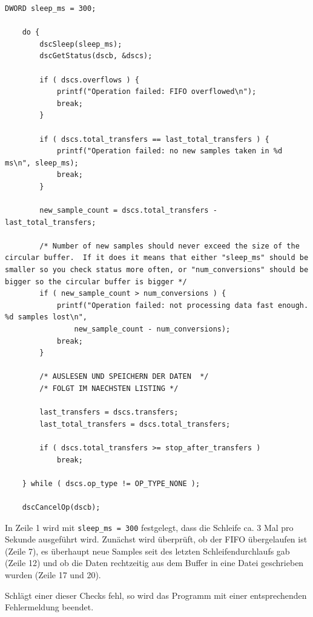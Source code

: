\documentclass[12pt,a4paper,twoside,BCOR=12.5mm]{scrartcl}
\begin{document}
\begin{lstlisting}[frame=trBL]
	DWORD sleep_ms = 300;
	
	do {
        dscSleep(sleep_ms);
        dscGetStatus(dscb, &dscs);

        if ( dscs.overflows ) {
            printf("Operation failed: FIFO overflowed\n");
            break;
        }

        if ( dscs.total_transfers == last_total_transfers ) {
            printf("Operation failed: no new samples taken in %d ms\n", sleep_ms);
            break;
        }

        new_sample_count = dscs.total_transfers - last_total_transfers;

        /* Number of new samples should never exceed the size of the circular buffer.  If it does it means that either "sleep_ms" should be smaller so you check status more often, or "num_conversions" should be bigger so the circular buffer is bigger */
        if ( new_sample_count > num_conversions ) {
            printf("Operation failed: not processing data fast enough.  %d samples lost\n",
                new_sample_count - num_conversions);
            break;
        }

		/* AUSLESEN UND SPEICHERN DER DATEN  */
		/* FOLGT IM NAECHSTEN LISTING */
       
        last_transfers = dscs.transfers;
        last_total_transfers = dscs.total_transfers;

        if ( dscs.total_transfers >= stop_after_transfers )
            break;

    } while ( dscs.op_type != OP_TYPE_NONE );

    dscCancelOp(dscb);
\end{lstlisting}	

In Zeile 1 wird mit \texttt{sleep\_ms = 300} festgelegt, dass die Schleife ca. 3 Mal pro Sekunde ausgeführt wird. Zunächst wird überprüft, ob der FIFO übergelaufen ist (Zeile 7), es überhaupt neue Samples seit des letzten Schleifendurchlaufs gab (Zeile 12) und ob die Daten rechtzeitig aus dem Buffer in eine Datei geschrieben wurden (Zeile 17 und 20). 

Schlägt einer dieser Checks fehl, so wird das Programm mit einer entsprechenden Fehlermeldung beendet.\\
\end{document}
